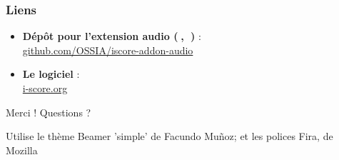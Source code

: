 \documentclass[draft]{beamer}
\begin{document}
\begin{frame}
    \frametitle{Liens} 
    \Large
    \begin{itemize}
        \setlength\itemsep{1em}
        \item \textbf{Dépôt pour l'extension audio ({\unicodefun 🍎, 🐧})} :~\\
        \url{github.com/OSSIA/iscore-addon-audio}
        \item \textbf{Le logiciel} :~\\
         \url{i-score.org}
    \end{itemize}
        
    \centering
    \vspace{2em}
    \Large{Merci ! Questions ?}
    \vspace{2em}
    
    \tiny{Utilise le thème Beamer 'simple' de Facundo Muñoz; et les polices Fira, de Mozilla}
\end{frame}    

\begin{frame}
	
	
\end{frame}
\end{document}
